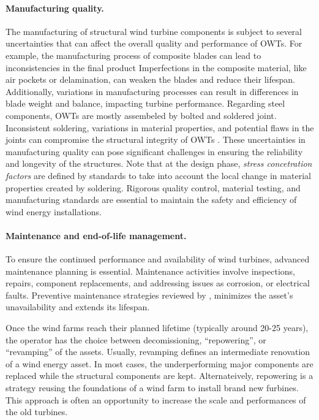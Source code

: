 \paragraph{Manufacturing quality.}
The manufacturing of structural wind turbine components is subject to several uncertainties that can affect the overall quality and performance of OWTs. 
For example, the manufacturing process of composite blades can lead to inconsistencies in the final product
Imperfections in the composite material, like air pockets or delamination, can weaken the blades and reduce their lifespan. 
Additionally, variations in manufacturing processes can result in differences in blade weight and balance, impacting turbine performance. 
Regarding steel components, OWTs are mostly assembeled by bolted and soldered joint. 
Inconsistent soldering, variations in material properties, and potential flaws in the joints can compromise the structural integrity of OWTs \citep{veers_2019_review}. 
These uncertainties in manufacturing quality can pose significant challenges in ensuring the reliability and longevity of the structures. 
Note that at the design phase, \textit{stress concetration factors} are defined by standards to take into account the local change in material properties created by soldering. 
Rigorous quality control, material testing, and manufacturing standards are essential to maintain the safety and efficiency of wind energy installations. 


\paragraph{Maintenance and end-of-life management.}

To ensure the continued performance and availability of wind turbines, advanced maintenance planning is essential. 
Maintenance activities involve inspections, repairs, component replacements, and addressing issues as corrosion, or electrical faults. 
Preventive maintenance strategies reviewed by \citet{ren_2021_owt_maintenance}, minimizes the asset's unavailability and extends its lifespan. 

Once the wind farms reach their planned lifetime (typically around 20-25 years), the operator has the choice between decomissioning, ``repowering'', or ``revamping'' of the assets. 
Usually, revamping defines an intermediate renovation of a wind energy asset. 
In most cases, the underperforming major components are replaced while the structural components are kept. 
Alternateively, repowering is a strategy reusing the foundations of a wind farm to install brand new furbines. 
This approach is often an opportunity to increase the scale and performances of the old turbines. 


